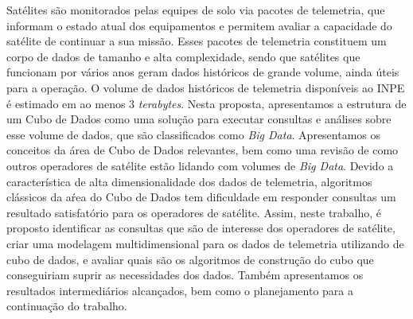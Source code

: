 
\begin{resumo}

\hypertarget{estilo:resumo}{} %

Satélites são monitorados pelas equipes de solo via pacotes de telemetria, que informam o estado atual dos equipamentos e permitem avaliar a capacidade do satélite de continuar a sua missão.
Esses pacotes de telemetria constituem um corpo de dados de tamanho e alta complexidade, sendo que satélites que funcionam por vários anos geram dados históricos de grande volume, ainda úteis para a operação.
{\color{cerulean}
O volume de dados históricos de telemetria disponíveis ao INPE é estimado em ao menos 3 \textit{terabytes}.
}
Nesta proposta, apresentamos a estrutura de um Cubo de Dados como uma solução para executar consultas e análises sobre esse volume de dados, que são classificados como \textit{Big Data}.
Apresentamos os conceitos da área de Cubo de Dados relevantes, bem como uma revisão de como outros operadores de satélite estão lidando com volumes de \textit{Big Data}.
Devido a característica de alta dimensionalidade dos dados de telemetria, algoritmos clássicos da aŕea do Cubo de Dados tem dificuldade em responder consultas um resultado satisfatório para os operadores de satélite.
Assim, neste trabalho, é proposto identificar as consultas que são de interesse dos operadores de satélite, criar uma modelagem multidimensional para os dados de telemetria utilizando de cubo de dados, e avaliar quais são os algoritmos de construção do cubo que conseguiriam suprir as necessidades dos dados.
Também apresentamos os resultados intermediários alcançados, bem como o planejamento para a continuação do trabalho.


\end{resumo}
